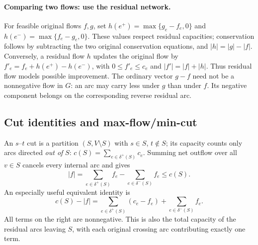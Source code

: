 \documentclass[10pt]{article}
\theoremstyle{definition}
\begin{document}
\paragraph{Comparing two flows: use the residual network.}
For feasible original flows $f,g$, set $h(e^+)=\max\{g_e-f_e,0\}$ and
$h(e^-)=\max\{f_e-g_e,0\}$. These values respect residual capacities;
conservation follows by subtracting the two original conservation equations,
and $|h|=|g|-|f|$. Conversely, a residual flow $h$ updates the original flow by
$f'_e=f_e+h(e^+)-h(e^-)$, with $0\le f'_e\le c_e$ and
$|f'|=|f|+|h|$. Thus residual flow models possible improvement.
The ordinary vector $g-f$ need not be a nonnegative flow in $G$: an arc may
carry less under $g$ than under $f$. Its negative component belongs on the
corresponding reverse residual arc.

\subsection{Cut identities and max-flow/min-cut}\label{nf:cuts}
An $s$--$t$ cut is a partition $(S,V\setminus S)$ with $s\in S$, $t\notin S$;
its capacity counts only arcs directed \emph{out of} $S$:
$c(S)=\sum_{e\in\delta^+(S)}c_e$.
Summing net outflow over all $v\in S$ cancels every internal arc and gives
\begin{equation}\label{nf:cut-identity}
 \boxed{|f|=\sum_{e\in\delta^+(S)}f_e-\sum_{e\in\delta^-(S)}f_e\le c(S).}
\end{equation}
An especially useful equivalent identity is
\begin{equation}\label{nf:cut-slack}
 \boxed{c(S)-|f|=
 \sum_{e\in\delta^+(S)}(c_e-f_e)+\sum_{e\in\delta^-(S)}f_e.}
\end{equation}
All terms on the right are nonnegative. This is also the total capacity
of the residual arcs leaving $S$, with each original crossing arc contributing
exactly one term.
\end{document}
